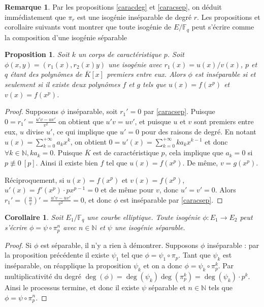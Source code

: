 \documentclass{article}
\theoremstyle{plain}%
\newtheorem{prop}[thm]{Proposition}
\newtheorem{cor}[thm]{Corollaire}
\theoremstyle{definition}%
\newtheorem{rem}[thm]{Remarque}
\newcommand{\F}{\mathbb{F}}
\newcommand{\N}{\mathbb{N}}
\begin{document}
\begin{rem}
  \label{degpi}
  Par les propositions \ref{caracdeg} et \ref{caracsep}, on déduit immédiatement que $\pi_r$ est une isogénie inséparable de degré $r$. Les propositions et corollaire suivants vont montrer que toute isogénie de $E/\F_q$ peut s'écrire comme la composition d'une isogénie séparable 
\end{rem}



\begin{prop}
  Soit $k$ un corps de caractéristique $p$. Soit $\phi(x, y) = (r_1(x), r_2(x)y)$ une isogénie avec $r_1(x) = u(x)/v(x)$, $p$ et $q$ étant des polynômes de $\overline{K}[x]$ premiers entre eux. Alors $\phi$ est inséparable si et seulement si il existe deux polynômes $f$ et $g$ tels que $u(x) = f(x^p)$ et $v(x) = f(x^p)$.
\end{prop}


\begin{proof}
  Supposons $\phi$ inséparable, soit $r_1' = 0$ par \ref{caracsep}. Puisque $0 = r_1' = \frac{u'v -uv'}{v^2}$ on obtient que $u'v = uv'$, et puisque $u$ et $v$ sont premiers entre eux, $u$ divise $u'$, ce qui implique que $u' = 0$ pour des raisons de degré.  En notant $u(x) = \sum_{k=0}^{+\infty} a_kx^k$, on obtient $0 = u'(x) = \sum_{k=0}^{+\infty} ka_kx^{k-1}$ et donc $\forall k\in \N, ka_k = 0$. Puisque $\overline{K}$ est de caractéristique $p$, cela implique que $a_k = 0$ si $p\not\equiv 0\ [p]$. Ainsi il existe bien $f$ tel que $u(x) = f(x^p)$. De même, $v = g(x^p)$. 

  Réciproquement, si $u(x) = f(x^p)$ et $v(x) = f(x^p)$, $u'(x) = f'(x^p)\cdot px^{p-1} = 0$ et de même pour $v$, donc $u' = v' = 0$. Alors $r_1' = (\frac{u}{v})' =  \frac{u'v -uv'}{v^2} = 0$, et donc $\phi$ est inséparable par \ref{caracsep}.
\end{proof}



\begin{cor}
  Soit $E_1/\F_q$ une courbe elliptique. Toute isogénie $\phi : E_1 \to E_2 $ peut s'écrire $\phi = \psi \circ \pi_p^n$ avec $n\in \N$ et $\psi$ une isogénie séparable.
\end{cor}

\begin{proof}
  Si $\phi$ est séparable, il n'y a rien à démontrer. Supposons $\phi$ inséparable : par la proposition précédente il existe $\psi_1$ tel que $\phi = \psi_1 \circ \pi_p$. Tant que $\psi_k$ est inséparable, on réapplique la proposition $\psi_k$ et on a donc $\phi = \psi_k \circ \pi_p^k$. 
  Par multiplicativité du degré $\deg(\phi) = \deg(\psi_k)\deg(\pi_p^k) = \deg(\psi_k)\cdot p^k$.
  Ainsi le processus termine, et donc il existe $\psi$ séparable et $n\in \N$ tels que $\phi = \psi \circ \pi_p^n$.
\end{proof}
\end{document}
